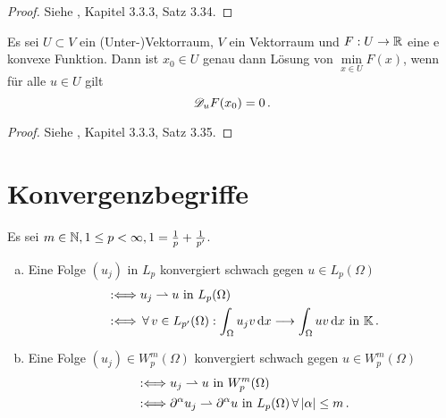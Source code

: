 \begin{proof}
Siehe \cite{GopRieTam}, Kapitel 3.3.3, Satz 3.34.
\end{proof}

\begin{satz}
Es sei $U\subset V$ ein (Unter-)Vektorraum, $V$ ein Vektorraum und $F: U \rightarrow \mathbb{R}$ eine e konvexe Funktion. Dann ist $x_0 \in U$ genau dann Lösung von $\min\limits_{x \in U} F(x)$, wenn für alle $u \in U$ gilt
\[
	\mathscr D_u F(x_0) = 0 \, .
\]
\end{satz}

\begin{proof}
Siehe \cite{GopRieTam}, Kapitel 3.3.3, Satz 3.35.
\end{proof}


\section{Konvergenzbegriffe}
\label{anhang:A.3}

\begin{defi}\label{defi:A.12}
Es sei $m\in \mathbb{N}, 1\leq p < \infty, 1 = \frac 1 p + \frac 1 {p'}$.
\begin{enumerate}[(a)]
\item Eine Folge $(u_j)$ in $L_p$ konvergiert schwach gegen $u \in L_p(\Omega)$
\begin{align*}
	&: \Longleftrightarrow u_j \rightharpoonup u \text{ in } L_p(\Omega) \\
	& : \Longleftrightarrow \, \forall \, v \in L_{p'}(\Omega) : \int_\Omega u_j v \,\mathrm{d} x \longrightarrow \int_\Omega uv \,\mathrm{d} x \text{ in } \mathbb{K} \, .
\end{align*}
\item Eine Folge $(u_j) \in W^m_p(\Omega)$ konvergiert schwach gegen $u \in W_p^m (\Omega)$
\begin{align*}
	& : \Longleftrightarrow u_j \rightharpoonup u \text{ in } W_p^m(\Omega) \\
	& : \Longleftrightarrow \partial^\alpha u_j \rightharpoonup \partial^\alpha u \text{ in } L_p(\Omega) \, \forall \, \lvert \alpha\rvert \leq m \, .
\end{align*}
\end{enumerate}
\end{defi}


